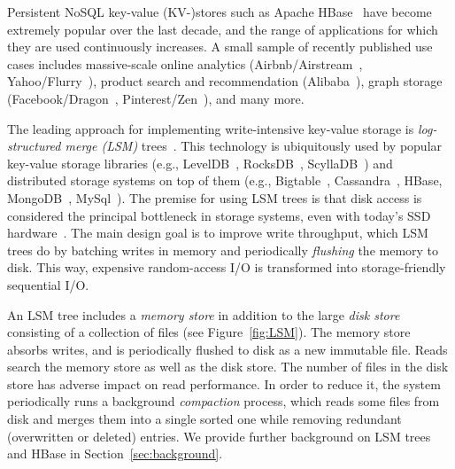 
Persistent NoSQL key-value (KV-)stores such as Apache HBase~\cite{hbase} have become extremely popular over the last decade, 
and the range of applications for which they are used continuously increases. A small sample of  recently 
published use cases includes massive-scale online analytics (Airbnb/Airstream~\cite{airbnb}, 
Yahoo/Flurry~\cite{flurry}), product search 
and recommendation (Alibaba~\cite{alibabahbase}), 
graph storage (Facebook/Dragon~\cite{dragon}, 
Pinterest/Zen~\cite{zen}), and many more. 

The leading approach for implementing write-intensive key-value storage is \emph{log-structured merge (LSM)} trees~\cite{O'Neil:1996}.
This technology is ubiquitously used by popular key-value storage libraries (e.g., LevelDB~\cite{leveldb}, 
RocksDB~\cite{rocksdb}, ScyllaDB~\cite{scylladb}) and distributed storage systems on top 
of them (e.g., Bigtable~\cite{Chang2008}, Cassandra~\cite{cassandra}, HBase, 
MongoDB~\cite{mongodb}, MySql~\cite{mysql}). 
The premise for using LSM trees is that disk access is considered the principal bottleneck in storage systems, even with today's SSD hardware~\cite{rocksdb,Tanenbaum:2014:MOS:2655363,Wu:2012:AWB:2093139.2093140}. 
The main design goal is to improve write throughput, which LSM trees do by batching writes in memory 
and periodically \emph{flushing} the memory  to disk. This way, expensive random-access I/O is transformed 
into storage-friendly sequential I/O. 

An LSM tree includes a \emph{memory store} in addition to the large \emph{disk store} consisting of a collection of files
(see Figure~\ref{fig:LSM}). 
The memory store absorbs writes, and is periodically flushed to disk as a new immutable file. Reads search the memory store
as well as the disk store. The number of files in the disk store has adverse impact on read performance. 
In order to reduce it, the system periodically runs a background \emph{compaction} process, which reads some files from 
disk and merges them into a single sorted one while removing redundant (overwritten or deleted) entries.
We provide further background on LSM trees and HBase in Section~\ref{sec:background}.

